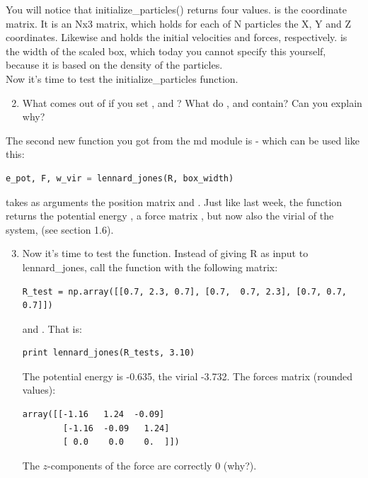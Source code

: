 \documentclass{article}
\begin{document}
You will notice that initialize\_particles() returns four values.
 is the coordinate matrix. It is an Nx3 matrix, which holds for each of N particles
the X, Y and Z coordinates.
Likewise  and  holds the initial velocities and forces, respectively.
 is the width of the scaled box, which today you cannot specify this yourself,
because it is based on the density of the particles.\\

Now it's time to test the initialize\_particles function.


\begin{enumerate}
    \setcounter{enumi}{1}

    \item What comes out of  if you set ,  and
        ? What do ,  and  contain? Can
        you explain why?

\end{enumerate}

The second new function you got from the md module is  - which
can be used like this:

\begin{lstlisting}[language=python]
e_pot, F, w_vir = lennard_jones(R, box_width)
\end{lstlisting}

 takes as arguments the position matrix  and .
Just like last week, the  function returns the potential energy
, a force matrix , but now also the virial of the system,
 (see section 1.6).\\


\begin{enumerate}
    \setcounter{enumi}{2}

    \item
    Now it's time to test the  function. Instead of giving R as input
    to lennard\_jones, call the function with the following  matrix:

\begin{lstlisting}
R_test = np.array([[0.7, 2.3, 0.7], [0.7,  0.7, 2.3], [0.7, 0.7, 0.7]])
\end{lstlisting}

    and . That is:

\begin{lstlisting}
print lennard_jones(R_tests, 3.10)
\end{lstlisting}

    The potential energy is -0.635, the virial -3.732. The forces matrix (rounded
    values):

\begin{lstlisting}
array([[-1.16   1.24  -0.09]
        [-1.16  -0.09   1.24]
        [ 0.0    0.0    0.  ]])
\end{lstlisting}

    The $z$-components of the force are correctly 0 (why?).

\end{enumerate}
\end{document}
